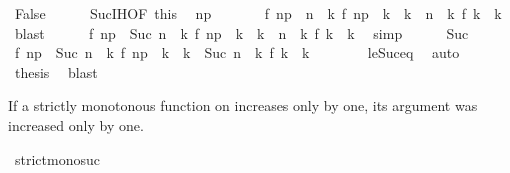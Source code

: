 \begin{isabellebody}
\ False\isanewline
\ \ \ \ \isamarkupfalse%
\ Suc{\isachardot}IH{\isacharbrackleft}OF\ this{\isacharbrackright}\ \isamarkupfalse%
\ n\isactrlsub p\isanewline
\ \ \ \ \ \ \ {\isacartoucheopen}f\ n\isactrlsub p\ {\isacharless}\ n\ {\isasymand}\ {\isacharparenleft}{\isasymforall}k{\isachardot}\ f\ n\isactrlsub p\ {\isacharless}\ k\ {\isasymand}\ k\ {\isasymle}\ n\ {\isasymlongrightarrow}\ {\isacharparenleft}{\isasymnexists}k\ f\ k\ {\isacharequal}\ k{\isacharparenright}{\isacharparenright}{\isacartoucheclose}\ \isamarkupfalse%
\ blast\isanewline
\ \ \ \ \isamarkupfalse%
\ {\isacartoucheopen}f\ n\isactrlsub p\ {\isacharless}\ Suc\ n\ {\isasymand}\ {\isacharparenleft}{\isasymforall}k{\isachardot}\ f\ n\isactrlsub p\ {\isacharless}\ k\ {\isasymand}\ k\ {\isasymle}\ n\ {\isasymlongrightarrow}\ {\isacharparenleft}{\isasymnexists}k\ f\ k\ {\isacharequal}\ k{\isacharparenright}{\isacharparenright}{\isacartoucheclose}\ \isamarkupfalse%
\ simp\isanewline
\ \ \ \ \isamarkupfalse%
\ Suc{\isacharparenleft}{}{\isacharparenright}\ \isamarkupfalse%
\ {\isacartoucheopen}f\ n\isactrlsub p\ {\isacharless}\ {\isacharparenleft}Suc\ n{\isacharparenright}\ {\isasymand}\ {\isacharparenleft}{\isasymforall}k{\isachardot}\ f\ n\isactrlsub p\ {\isacharless}\ k\ {\isasymand}\ k\ {\isasymle}\ {\isacharparenleft}Suc\ n{\isacharparenright}\ {\isasymlongrightarrow}\ {\isacharparenleft}{\isasymnexists}k\ f\ k\ {\isacharequal}\ k{\isacharparenright}{\isacharparenright}{\isacartoucheclose}\isanewline
\ \ \ \ \ \ \isamarkupfalse%
\ le{\isacharunderscore}Suc{\isacharunderscore}eq\ \isamarkupfalse%
\ auto\isanewline
\ \ \ \ \isamarkupfalse%
\ {\isacharquery}thesis\ \isamarkupfalse%
\ blast\isanewline
\ \ \isamarkupfalse%
\isanewline
{}\isamarkupfalse%
%
\endisatagproof
{\isafoldproof}%
%
\isadelimproof
%
\endisadelimproof
%
\begin{isamarkuptext}%
If a strictly monotonous function on  increases only by one,
  its argument was increased only by one.%
\end{isamarkuptext}\isamarkuptrue%
\isamarkupfalse%
\ strict{\isacharunderscore}mono{\isacharunderscore}suc{\isacharcolon}\isanewline

\end{isabellebody}
